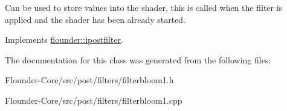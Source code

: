 Can be used to store values into the shader, this is called when the filter is applied and the shader has been already started. 



Implements \hyperlink{classflounder_1_1ipostfilter_a9b658b4672718d5ac36539875bde722e}{flounder\+::ipostfilter}.



The documentation for this class was generated from the following files\+:\begin{DoxyCompactItemize}
\item 
Flounder-\/\+Core/src/post/filters/filterbloom1.\+h\item 
Flounder-\/\+Core/src/post/filters/filterbloom1.\+cpp\end{DoxyCompactItemize}
